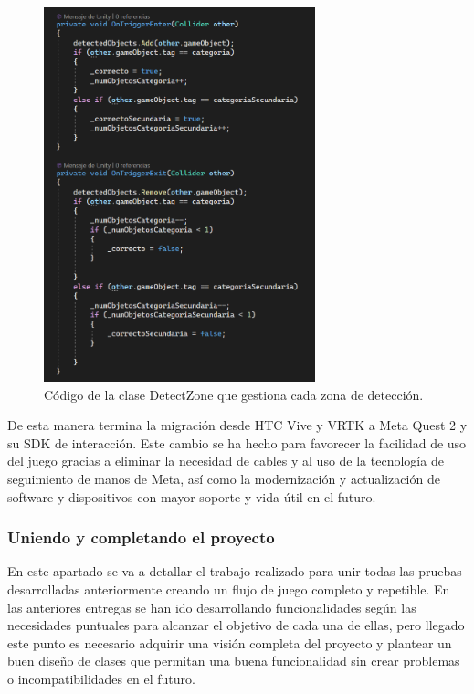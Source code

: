 \begin{figure}
	\centering
	\includegraphics[width=0.7\textwidth]{04.Desarrollo/05.Entrega5/01.Iteracion5_1/00.Figuras/08.detect_zone_codigo.png}
	\caption{Código de la clase DetectZone que gestiona cada zona de detección.}
	\label{fig:detectZoneCodigo}
\end{figure}




De esta manera termina la migración desde HTC Vive y VRTK a Meta Quest 2 y su SDK de interacción. Este cambio se ha hecho para favorecer la facilidad de uso del juego gracias a eliminar la necesidad de cables y al uso de la tecnología de seguimiento de manos de Meta, así como la modernización y actualización de software y dispositivos con mayor soporte y vida útil en el futuro.


\subsubsection{Uniendo y completando el proyecto}

En este apartado se va a detallar el trabajo realizado para unir todas las pruebas desarrolladas anteriormente creando un flujo de juego completo y repetible. En las anteriores entregas se han ido desarrollando funcionalidades según las necesidades puntuales para alcanzar el objetivo de cada una de ellas, pero llegado este punto es necesario adquirir una visión completa del proyecto y plantear un buen diseño de clases que permitan una buena funcionalidad sin crear problemas o incompatibilidades en el futuro. 

